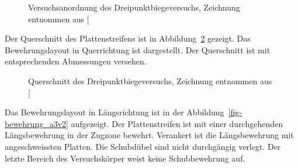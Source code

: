 \documentclass[
  11pt,
  letterpaper,
]{scrreprt}
\begin{document}
\begin{figure}[H]


\caption{\label{fig-anordnung_a3v2}Versuchsanordnung des
Dreipunktbiegeversuchs, Zeichnung entnommen aus
{[}\citeproc{ref-jager_versuche_2006}{2}{]}}

\end{figure}%

Der Querschnitt des Plattenstreifens ist in Abbildung~\ref{fig-qs_a3v2}
gezeigt. Das Bewehrungslayout in Querrichtung ist dargestellt. Der
Querschnitt ist mit entsprechenden Abmessungen versehen.

\begin{figure}[H]


\caption{\label{fig-qs_a3v2}Querschnitt des Dreipunktbiegeversuchs,
Zeichnung entnommen aus {[}\citeproc{ref-gitz_ansatze_2024}{1}{]}}

\end{figure}%

Das Bewehrungslayout in Längsrichtung ist in der
Abbildung~\ref{fig-bewehrung_a3v2} aufgezeigt. Der Plattenstreifen ist
mit einer durchgehenden Längsbewehrung in der Zugzone bewehrt. Verankert
ist die Längsbewehrung mit angeschweissten Platten. Die Schubdübel sind
nicht durchgängig verlegt. Der letzte Bereich des Versuchskörper weist
keine Schubbewehrung auf.
\end{document}
